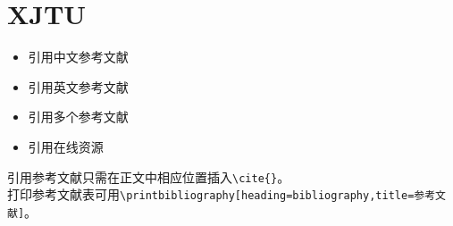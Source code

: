 \documentclass[twoside]{article}
\begin{document}
    \section*{XJTU}



\begin{itemize}
  \item 引用中文参考文献\cite{冯慈璋2000工程电磁场导论}
  \item 引用英文参考文献\cite{Xing2002Distance}
  \item 引用多个参考文献\cite{成永红2001电力设备绝缘检测与诊断,成永红2004气体绝缘系统中典型缺陷的超宽频带放电信号的分形分析,吴锴2013纳米粒子改性聚乙烯直流电缆绝缘材料研究}
  \item 引用在线资源\cite{github}
\end{itemize}
引用参考文献只需在正文中相应位置插入\verb|\cite{}|。 \\
打印参考文献表可用\verb|\printbibliography[heading=bibliography,title=参考文献]|。


\printbibliography
\end{document}
